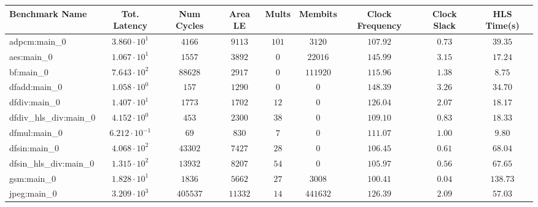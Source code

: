 \begin{tabular}{|l|c|c|c|c|c|c|c|c|}
\hline
Benchmark Name          & Tot. Latency            & Num Cycles & Area LE   & Mults   & Membits    & Clock Frequency & Clock Slack & HLS Time(s) \\
\hline
adpcm:main\_0           & $ 3.860 \cdot 10^{1}  $ & $ 4166   $ & $ 9113  $ & $ 101 $ & $ 3120   $ & $ 107.92      $ & $ 0.73    $ & $ 39.35   $ \\
aes:main\_0             & $ 1.067 \cdot 10^{1}  $ & $ 1557   $ & $ 3892  $ & $ 0   $ & $ 22016  $ & $ 145.99      $ & $ 3.15    $ & $ 17.24   $ \\
bf:main\_0              & $ 7.643 \cdot 10^{2}  $ & $ 88628  $ & $ 2917  $ & $ 0   $ & $ 111920 $ & $ 115.96      $ & $ 1.38    $ & $ 8.75    $ \\
dfadd:main\_0           & $ 1.058 \cdot 10^{0}  $ & $ 157    $ & $ 1290  $ & $ 0   $ & $ 0      $ & $ 148.39      $ & $ 3.26    $ & $ 34.70   $ \\
dfdiv:main\_0           & $ 1.407 \cdot 10^{1}  $ & $ 1773   $ & $ 1702  $ & $ 12  $ & $ 0      $ & $ 126.04      $ & $ 2.07    $ & $ 18.17   $ \\
dfdiv\_hls\_div:main\_0 & $ 4.152 \cdot 10^{0}  $ & $ 453    $ & $ 2300  $ & $ 38  $ & $ 0      $ & $ 109.10      $ & $ 0.83    $ & $ 18.33   $ \\
dfmul:main\_0           & $ 6.212 \cdot 10^{-1} $ & $ 69     $ & $ 830   $ & $ 7   $ & $ 0      $ & $ 111.07      $ & $ 1.00    $ & $ 9.80    $ \\
dfsin:main\_0           & $ 4.068 \cdot 10^{2}  $ & $ 43302  $ & $ 7427  $ & $ 28  $ & $ 0      $ & $ 106.45      $ & $ 0.61    $ & $ 68.04   $ \\
dfsin\_hls\_div:main\_0 & $ 1.315 \cdot 10^{2}  $ & $ 13932  $ & $ 8207  $ & $ 54  $ & $ 0      $ & $ 105.97      $ & $ 0.56    $ & $ 67.65   $ \\
gsm:main\_0             & $ 1.828 \cdot 10^{1}  $ & $ 1836   $ & $ 5662  $ & $ 27  $ & $ 3008   $ & $ 100.41      $ & $ 0.04    $ & $ 138.73  $ \\
jpeg:main\_0            & $ 3.209 \cdot 10^{3}  $ & $ 405537 $ & $ 11332 $ & $ 14  $ & $ 441632 $ & $ 126.39      $ & $ 2.09    $ & $ 57.03   $ \\

\end{tabular}
